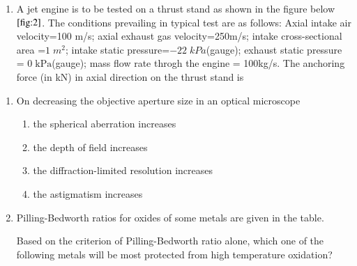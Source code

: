 \documentclass[journal]{IEEEtran}
\numberwithin{equation}{enumi}
\numberwithin{figure}{enumi}
\begin{document}
\begin{enumerate}
\item A jet engine is to be tested on a thrust stand as shown in the figure below$\ref{fig:2}$. The conditions prevailing in typical test are as follows: Axial intake air velocity=100 m/s; axial exhaust gas velocity=250m/s; intake cross-sectional area =$1\;m^2$; intake static pressure=$-22\;kPa$(gauge); exhaust static pressure = $0\;\text{kPa}$(gauge); mass flow rate throgh the engine = 100kg/s. The anchoring force (in kN) in axial direction on the thrust stand is \underline{\hspace{1cm}}
\begin{figure}[H]
    \centering
    
    \caption{}
    \label{fig:2}
\end{figure}
\bigskip
\end{enumerate}
\begin{enumerate}
\section*{Q.1 to Q.9 carry 1 mark each}
\item On decreasing the objective aperture size in an optical microscope

\begin{enumerate}
    \item the spherical aberration increases
    \item the depth of field increases
    \item the diffraction-limited resolution increases
    \item the astigmatism increases
\end{enumerate}
\bigskip

\item Pilling-Bedworth ratios for oxides of some metals are given in the table.

\begin{table}[h]    
  \centering
  
\end{table}

Based on the criterion of Pilling-Bedworth ratio alone, which one of the following metals will be most protected from high temperature oxidation?

\begin{enumerate}
\end{enumerate}
\bigskip


\end{enumerate}
\end{document}
